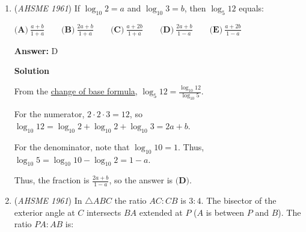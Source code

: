 \begin{enumerate}
 \textbf{Answer: }B



\textbf{Solution}

From \href{https://artofproblemsolving.com/wiki/index.php?title=Vieta\%27s\_Formulas}{Vieta's Formulas}, $r+s=\frac{-b}{a}$ and $rs=\frac{c}{a}$ in the original quadratic.

 The sum of the roots in the new quadratic is
 \[ar + b + as + b\]
 \[a(r+s) + 2b\]
 \[b\]The product of the roots in the new quadratic is
 \[(ar + b)(as + b)\]
 \[a^2rs + arb + asb + b^2\]
 \[a^2rs + ab(r+s) + b^2\]
 \[ac - b^2 + b^2\]
 \[ac\]Thus, the new quadratic is $x^2-bx+ac$.  The answer is $\boxed{\textbf{(B)}}$.

 



\textbf{Solution 2}

Let $f(x)=ax^2+bx+c$ and $g(x)$ be the desired function with roots $ar+b$ and $as+b$. Applying graphical transformations, we have
 \[f(r)=f(s)=0\]
 \[f(\frac{(ar+b)-b}{a})=f(\frac{(as+b)-b}{a})=0\]Thus $ar+b$ and $as+b$ are the roots to
 \[g(x)=f(\frac{x-b}{a})\]Plugging $x=\frac{x-b}{a}$ into $f(x)$ gets $g(x)=x^2-bx+ac \boxed{B}$.

 


	\item (\textit{AHSME 1961}) If $\log_{10}2=a$ and $\log_{10}3=b$, then $\log_{5}12$ equals:


 $\textbf{(A)}\ \frac{a+b}{1+a}\qquad \textbf{(B)}\ \frac{2a+b}{1+a}\qquad \textbf{(C)}\ \frac{a+2b}{1+a}\qquad \textbf{(D)}\ \frac{2a+b}{1-a}\qquad \textbf{(E)}\ \frac{a+2b}{1-a}$

 \textbf{Answer: }D



\textbf{Solution}

From the \href{https://artofproblemsolving.com/wiki/index.php?title=Change\_of\_base\_formula}{change of base formula}, $\log_{5}12 = \frac{\log_{10}12}{\log_{10}5}$.

 For the numerator, $2 \cdot 2 \cdot 3 = 12$, so $\log_{10}12 = \log_{10}2 + \log_{10}2 + \log_{10}3 = 2a+b$.

 For the denominator, note that $\log_{10}10 = 1$.  Thus, $\log_{10}5 = \log_{10}10 - \log_{10}2 = 1 - a$.

 Thus, the fraction is $\frac{2a+b}{1-a}$, so the answer is $\boxed{\textbf{(D)}}$.

 


	\item (\textit{AHSME 1961}) In $\triangle ABC$ the ratio $AC:CB$ is $3:4$. The bisector of the exterior angle at $C$ intersects $BA$ extended at $P$ 
($A$ is between $P$ and $B$). The ratio $PA:AB$ is:



\end{enumerate}
